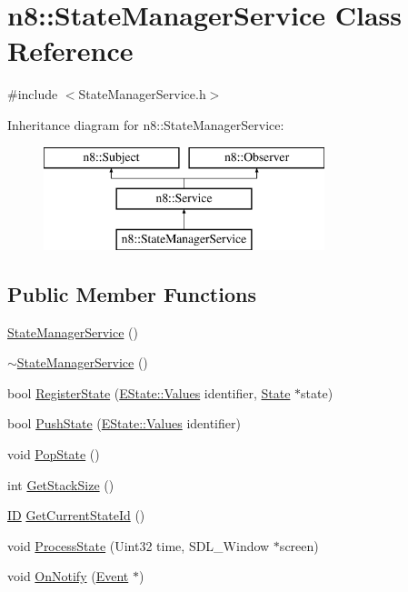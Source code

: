 \hypertarget{classn8_1_1_state_manager_service}{\section{n8\-:\-:State\-Manager\-Service Class Reference}
\label{classn8_1_1_state_manager_service}
}


{\ttfamily \#include $<$State\-Manager\-Service.\-h$>$}

Inheritance diagram for n8\-:\-:State\-Manager\-Service\-:\begin{figure}[H]
\begin{center}
\leavevmode
\includegraphics[height=3.000000cm]{classn8_1_1_state_manager_service}
\end{center}
\end{figure}
\subsection*{Public Member Functions}
\begin{DoxyCompactItemize}
\item 
\hyperlink{classn8_1_1_state_manager_service_af22d4c68cce45903992e1bfcb12e85f3}{State\-Manager\-Service} ()
\item 
\hyperlink{classn8_1_1_state_manager_service_a6293e74d12398884b2154dda87f507ce}{$\sim$\-State\-Manager\-Service} ()
\item 
bool \hyperlink{classn8_1_1_state_manager_service_a287093da3f70c807293f3199aa9a6232}{Register\-State} (\hyperlink{namespace_e_state_aee586325ec9fecd1205d41439870dd81}{E\-State\-::\-Values} identifier, \hyperlink{classn8_1_1_state}{State} $\ast$state)
\item 
bool \hyperlink{classn8_1_1_state_manager_service_a4cec486fa154cc2ded5d5c348bf5f140}{Push\-State} (\hyperlink{namespace_e_state_aee586325ec9fecd1205d41439870dd81}{E\-State\-::\-Values} identifier)
\item 
void \hyperlink{classn8_1_1_state_manager_service_a903f56a680ac411d2ae7f34f4e251c38}{Pop\-State} ()
\item 
int \hyperlink{classn8_1_1_state_manager_service_ac553d556b5c925025252719d4319b3de}{Get\-Stack\-Size} ()
\item 
\hyperlink{class_i_d}{I\-D} \hyperlink{classn8_1_1_state_manager_service_a1e11e7a3f32567f416141f436904025d}{Get\-Current\-State\-Id} ()
\item 
void \hyperlink{classn8_1_1_state_manager_service_a85d24e9b582f01d65e90c33fa36a6764}{Process\-State} (Uint32 time, S\-D\-L\-\_\-\-Window $\ast$screen)
\item 
void \hyperlink{classn8_1_1_state_manager_service_a931551f9b6dc470297e9d86abf27b603}{On\-Notify} (\hyperlink{classn8_1_1_event}{Event} $\ast$)
\end{DoxyCompactItemize}
